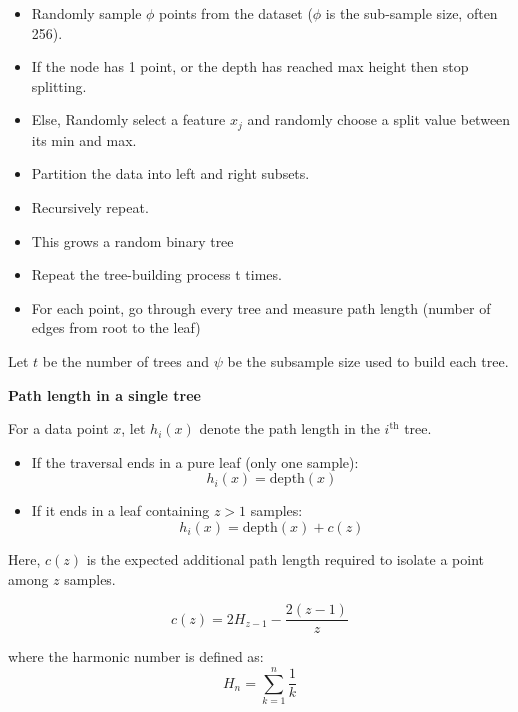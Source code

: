 \documentclass[10pt,a4paper]{article}
\begin{document}
		\begin{itemize}
			\item Randomly sample $\phi$ points from the dataset ($\phi$  is the sub-sample size, often 256).
			\item If the node has 1 point, or the depth has reached max height then stop splitting.
			\item Else, Randomly select a feature $x_j$ and randomly choose a split value between its min and max.
			\item Partition the data into left and right subsets.
			\item Recursively repeat.
			\item This grows a random binary tree
			\item Repeat the tree-building process t times.
			\item For each point, go through every tree and measure path length (number of edges from root to the leaf)
		\end{itemize}

		
		Let $t$ be the number of trees and $\psi$ be the subsample size used to build each tree.
		
		\vspace{0.5em}
		
		\textbf{Path length in a single tree}
		
		For a data point $x$, let $h_i(x)$ denote the path length in the $i^{\text{th}}$ tree.
		
		\begin{itemize}
		\item If the traversal ends in a pure leaf (only one sample):
		\begin{equation*}
		h_i(x) = \mathrm{depth}(x)
		\end{equation*}
		
		\item If it ends in a leaf containing $z > 1$ samples:
		\begin{equation*}
		h_i(x) = \mathrm{depth}(x) + c(z)
		\end{equation*}
		\end{itemize}
		
		Here, $c(z)$ is the expected additional path length required to isolate a point among $z$ samples.
		
		\begin{equation*}
		c(z) = 2 H_{z-1} - \frac{2(z-1)}{z}
		\end{equation*}
		
		where the harmonic number is defined as:
		\begin{equation*}
		H_n = \sum_{k=1}^{n} \frac{1}{k}
		\end{equation*}
		
\end{document}
